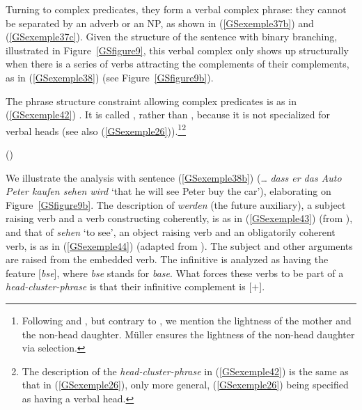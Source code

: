 
\noindent
Turning to complex predicates, they form a verbal complex phrase: they cannot be separated by an adverb or an NP, as shown in (\ref{GSexemple37b}) and (\ref{GSexemple37c}). Given the structure of the  sentence with binary branching, illustrated in Figure~\ref{GSfigure9}, this verbal complex only shows up structurally when there is a series of verbs attracting the complements of their complements, as in (\ref{GSexemple38}) (see Figure~\ref{GSfigure9b}).

The phrase structure constraint allowing complex predicates is as in (\ref{GSexemple42})
\parencites{MuellerCopula}[39]{muller2018clause}. It is called ,
rather than , because it is not specialized for verbal heads (see also
(\ref{GSexemple26})).\footnote{Following \citet[]{HN94a} and \citet[]{dKM2001a}, but contrary to
  \textcites[]{Mueller2005c}{muller2018clause}, we mention the lightness of the mother and
  the non-head daughter. Müller ensures the lightness of the non-head daughter via selection.}\footnote{The description of the \emph{head-cluster-phrase} in (\ref{GSexemple42}) is the same as that in (\ref{GSexemple26}), only more general, (\ref{GSexemple26}) being specified as having a verbal head.}  

\eas
\label{GSexemple42}\label{ex-head-cluster-phrase-German}%
 () \impl \\
\zs

\noindent
We illustrate the analysis with sentence (\ref{GSexemple38b}) (\ldots{} \emph{dass er das Auto Peter
  kaufen sehen wird} `that he will see Peter buy the car’), elaborating on
Figure~\ref{GSfigure9b}. The description of \emph{werden} (the future auxiliary), a subject raising
verb and a verb constructing coherently, is as in (\ref{GSexemple43}) (from
\citealt[39]{muller2018clause}), and that of \emph{sehen} `to see', an object raising verb and an
obligatorily coherent verb, is as in (\ref{GSexemple44}) (adapted from
\citealt[102]{Mueller2002b}). The subject and other arguments are raised from the embedded verb. The
infinitive is analyzed as having the feature [\vform \textit{bse}], where \textit{bse} stands for
\emph{base}. What forces these verbs to be part of a \emph{head-cluster-phrase} is that their
infinitive complement is \mbox{[\light{}$+$]}.

